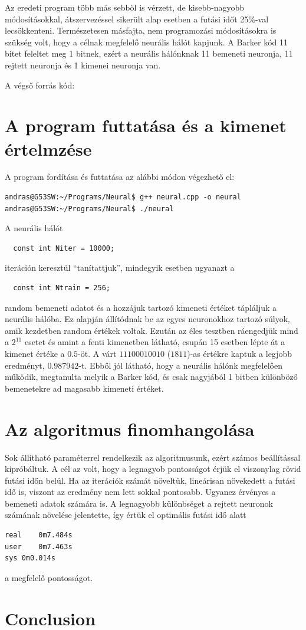 \documentclass[a4paper]{article}
\begin{document}
Az eredeti program több más sebből is vérzett, de kisebb-nagyobb módosításokkal, átszervezéssel sikerült alap esetben a futási időt 25\%-val lecsökkenteni.
Természetesen másfajta, nem programozási módosításokra is szükség volt, hogy a célnak megfelelő neurális hálót kapjunk. A Barker kód 11 bitet feleltet meg 1 bitnek, ezért a neurális hálónknak 11 bemeneti neuronja, 11 rejtett neuronja és 1 kimenei neuronja van.

A végső forrás kód:



\section{A program futtatása és a kimenet értelmzése}

A program fordítása és futtatása az alábbi módon végezhető el:

\lstset{language=Bash}
\begin{lstlisting}
andras@G53SW:~/Programs/Neural$ g++ neural.cpp -o neural
andras@G53SW:~/Programs/Neural$ ./neural
\end{lstlisting}



A neurális hálót

\lstset{language=C++}
\begin{lstlisting}
  const int Niter = 10000;
\end{lstlisting}
iteráción keresztül ``tanítattjuk'', mindegyik esetben ugyanazt a
\begin{lstlisting}
  const int Ntrain = 256;
\end{lstlisting}
random bemeneti adatot és a hozzájuk tartozó kimeneti értéket tápláljuk a neurális hálóba. Ez alapján állítódnak be az egyes neuronokhoz tartozó súlyok, amik kezdetben random értékek voltak. Ezután az éles tesztben ráengedjük mind a $2^{11}$ esetet és amint a fenti kimenetben látható, csupán 15 esetben lépte át a kimenet értéke a $0.5$-öt. A várt $11100010010$ ($1811$)-as értékre kaptuk a legjobb eredményt, $0.987942$-t. Ebből jól látható, hogy a neurális hálónk megfelelően működik, megtanulta melyik a Barker kód, és csak nagyjából 1 bitben különböző bemenetekre ad magasabb kimeneti értéket.

\section{Az algoritmus finomhangolása}
Sok állítható paraméterrel rendelkezik az algoritmusunk, ezért számos beállítással kipróbáltuk. A cél az volt, hogy a legnagyob pontosságot érjük el viszonylag rövid futási időn belül. Ha az iterációk számát növeltük, lineárisan növekedett a futási idő is, viszont az eredmény nem lett sokkal pontosabb. Ugyanez érvényes a bemeneti adatok számára is. A legnagyobb különbséget a rejtett neuronok számának növelése jelentette, így értük el optimális futási idő alatt

\lstset{language=Bash}
\begin{lstlisting}
real	0m7.484s
user	0m7.463s
sys	0m0.014s
\end{lstlisting}

a megfelelő pontosságot.

\section{Conclusion}
\end{document}
